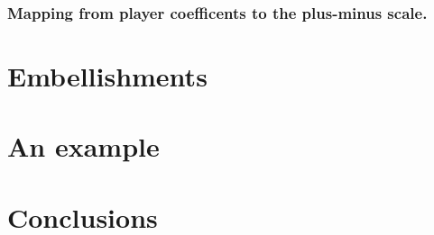 \subsubsection{Mapping from player coefficents to the plus-minus scale.}



\section{Embellishments}
\label{sec:embell}

\section{An example}
\label{sec:example}

\section{Conclusions}
\label{sec:conclude}


